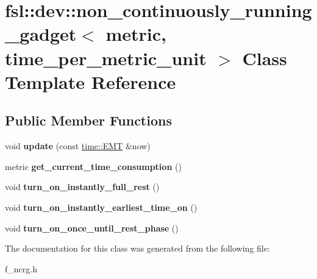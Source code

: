 \hypertarget{classfsl_1_1dev_1_1non__continuously__running__gadget}{}\section{fsl\+::dev\+::non\+\_\+continuously\+\_\+running\+\_\+gadget$<$ metric, time\+\_\+per\+\_\+metric\+\_\+unit $>$ Class Template Reference}
\label{classfsl_1_1dev_1_1non__continuously__running__gadget}
\subsection*{Public Member Functions}
\begin{DoxyCompactItemize}
\item 
\mbox{\label{classfsl_1_1dev_1_1non__continuously__running__gadget_a4f575c6d70b06bff42f807642c62cf13}} 
void {\bfseries update} (const \mbox{\hyperlink{classtime_1_1_extended_metric_time}{time\+::\+E\+MT}} \&now)
\item 
\mbox{\label{classfsl_1_1dev_1_1non__continuously__running__gadget_a11098dd022ebcb6df77b325b52bb018f}} 
metric {\bfseries get\+\_\+current\+\_\+time\+\_\+consumption} ()
\item 
\mbox{\label{classfsl_1_1dev_1_1non__continuously__running__gadget_a63b32f14b0aa6d09f0e7ace369a72cc8}} 
void {\bfseries turn\+\_\+on\+\_\+instantly\+\_\+full\+\_\+rest} ()
\item 
\mbox{\label{classfsl_1_1dev_1_1non__continuously__running__gadget_ab065441fe48aa12697516dee95ba88cd}} 
void {\bfseries turn\+\_\+on\+\_\+instantly\+\_\+earliest\+\_\+time\+\_\+on} ()
\item 
\mbox{\label{classfsl_1_1dev_1_1non__continuously__running__gadget_a8cd1ef586b9e966f999c26831d16a1a2}} 
void {\bfseries turn\+\_\+on\+\_\+once\+\_\+until\+\_\+rest\+\_\+phase} ()
\end{DoxyCompactItemize}


The documentation for this class was generated from the following file\+:\begin{DoxyCompactItemize}
\item 
f\+\_\+ncrg.\+h\end{DoxyCompactItemize}
